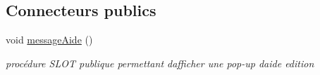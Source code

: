 \subsection*{Connecteurs publics}
\begin{DoxyCompactItemize}
\item 
void \hyperlink{class_tab_edition_ae7affcb0acaf7fafdcc5586804907aed}{message\+Aide} ()\hypertarget{class_tab_edition_ae7affcb0acaf7fafdcc5586804907aed}{}\label{class_tab_edition_ae7affcb0acaf7fafdcc5586804907aed}

\begin{DoxyCompactList}\small\item\em procédure S\+L\+OT publique permettant d\textquotesingle{}afficher une pop-\/up d\textquotesingle{}aide edition \end{DoxyCompactList}\end{DoxyCompactItemize}

